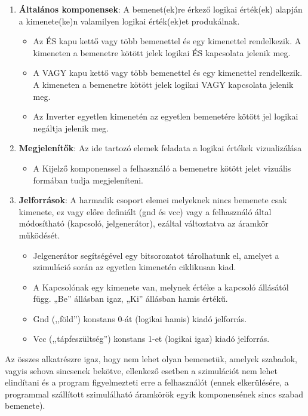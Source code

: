 \begin{enumerate}
\item \textbf{Általános komponensek}: A bemenet(ek)re érkező logikai érték(ek) alapján a kimenete(ke)n valamilyen logikai érték(ek)et produkálnak.
\begin{itemize}
\setlength{\itemsep}{0cm}%
\setlength{\parskip}{0cm}%
\item Az ÉS kapu kettő vagy több bemenettel és egy kimenettel rendelkezik. A kimeneten a bemenetre kötött jelek logikai ÉS kapcsolata jelenik meg. 
\item A VAGY kapu kettő vagy több bemenettel és egy kimenettel rendelkezik. A kimeneten a bemenetre kötött jelek logikai VAGY kapcsolata jelenik meg.
\item Az Inverter egyetlen kimenetén az egyetlen bemenetére kötött jel logikai negáltja jelenik meg.
\end{itemize}

\item \textbf{Megjelenítők}: Az ide tartozó elemek feladata a logikai értékek vizualizálása
\begin{itemize}
\setlength{\itemsep}{0cm}%
\setlength{\parskip}{0cm}%
\item A Kijelző komponenssel a felhasználó a bemenetre kötött jelet vizuális formában tudja megjeleníteni.
\end{itemize}

\item \textbf{Jelforrások}: A harmadik csoport elemei melyeknek nincs bemenete csak kimenete, ez vagy előre definiált (gnd és vcc) vagy a felhasználó által módosítható (kapcsoló, jelgenerátor), ezáltal változtatva az áramkör működését.
\begin{itemize}
\setlength{\itemsep}{0cm}%
\setlength{\parskip}{0cm}%
\item Jelgenerátor segítségével egy bitsorozatot tárolhatunk el, amelyet a szimuláció során az egyetlen kimenetén ciklikusan kiad.
\item A Kapcsolónak egy kimenete van, melynek értéke a kapcsoló állásától függ. „Be” állásban igaz, „Ki” állásban hamis értékű.
\item Gnd (,,föld'') konstans 0-át (logikai hamis) kiadó jelforrás.
\item Vcc (,,tápfeszültség'') konstans 1-et (logikai igaz) kiadó jelforrás.
\end{itemize}
\end{enumerate}

Az összes alkatrészre igaz, hogy nem lehet olyan bemenetük, amelyek szabadok, vagyis sehova sincsenek bekötve, ellenkező esetben a szimulációt nem lehet elindítani és a program figyelmezteti erre a felhasználót (ennek elkerülésére, a programmal szállított szimulálható áramkörök egyik komponensének sincs szabad bemenete).

